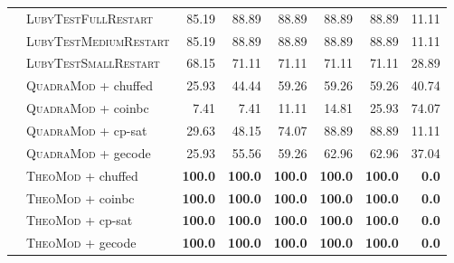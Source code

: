 \documentclass{book}
\begin{document}
\begin{table}[]
\begin{tabular}{@{}ll rr rr rr@{}}
& \textsc{LubyTestFullRestart}   & 85.19 & 88.89 & 88.89 & 88.89 & 88.89 & 11.11 \\
& \textsc{LubyTestMediumRestart}   & 85.19 & 88.89 & 88.89 & 88.89 & 88.89 & 11.11 \\
& \textsc{LubyTestSmallRestart}   & 68.15 & 71.11 & 71.11 & 71.11 & 71.11 & 28.89 \\
& \textsc{QuadraMod} + chuffed   & 25.93 & 44.44 & 59.26 & 59.26 & 59.26 & 40.74 \\
& \textsc{QuadraMod} + coinbc   & 7.41 & 7.41 & 11.11 & 14.81 & 25.93 & 74.07 \\
& \textsc{QuadraMod} + cp-sat   & 29.63 & 48.15 & 74.07 & 88.89 & 88.89 & 11.11 \\
& \textsc{QuadraMod} + gecode   & 25.93 & 55.56 & 59.26 & 62.96 & 62.96 & 37.04 \\
& \textsc{TheoMod} + chuffed   & \bf 100.0 & \bf 100.0 & \bf 100.0 & \bf 100.0 & \bf 100.0 &  \bf 0.0 \\
& \textsc{TheoMod} + coinbc   & \bf 100.0 & \bf 100.0 & \bf 100.0 & \bf 100.0 & \bf 100.0 &  \bf 0.0 \\
& \textsc{TheoMod} + cp-sat   & \bf 100.0 & \bf 100.0 & \bf 100.0 & \bf 100.0 & \bf 100.0 &  \bf 0.0 \\
& \textsc{TheoMod} + gecode   & \bf 100.0 & \bf 100.0 & \bf 100.0 & \bf 100.0 & \bf 100.0 &  \bf 0.0 \\
\bottomrule\end{tabular} 

\end{table} 


\vspace{2cm}
\end{document}
